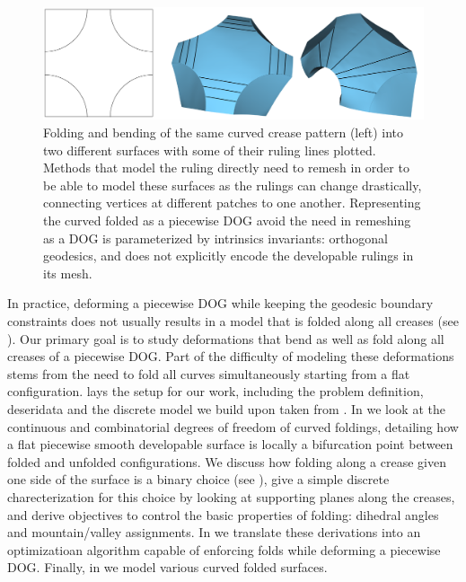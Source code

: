 \begin{figure} [h]
	\centering
	\includegraphics[width=\linewidth]{figures/rulings_problem_curve}
	\caption{Folding and bending of the same curved crease pattern (left) into two different surfaces with some of their ruling lines plotted. Methods that model the ruling directly need to remesh in order to be able to model these surfaces as the rulings can change drastically, connecting vertices at different patches to one another. Representing the curved folded as a piecewise DOG avoid the need in remeshing as a DOG is parameterized by intrinsics invariants: orthogonal geodesics, and does not explicitly encode the developable rulings in its mesh. }
	\label{fig:rulings_problem_curve}
\end{figure}

In practice, deforming a piecewise DOG while keeping the geodesic boundary constraints does not usually results in a model that is folded along all creases (see ). Our primary goal is to study deformations that bend as well as fold along all creases of a piecewise DOG. Part of the difficulty of modeling these deformations stems from the need to fold all curves simultaneously starting from a flat configuration.  lays the setup for our work, including the problem definition, deseridata and the discrete model we build upon taken from \cite{rabi18,rabi2018shape}. In  we look at the continuous and combinatorial degrees of freedom of curved foldings, detailing how a flat piecewise smooth developable surface is locally a bifurcation point between folded and unfolded configurations. We discuss how folding along a crease given one side of the surface is a binary choice (see ), give a simple discrete charecterization for this choice by looking at supporting planes along the creases, and derive objectives to control the basic properties of folding: dihedral angles and mountain/valley assignments. In  we translate these derivations into an optimizatioan algorithm capable of enforcing folds while deforming a piecewise DOG. Finally, in  we model various curved folded surfaces.

